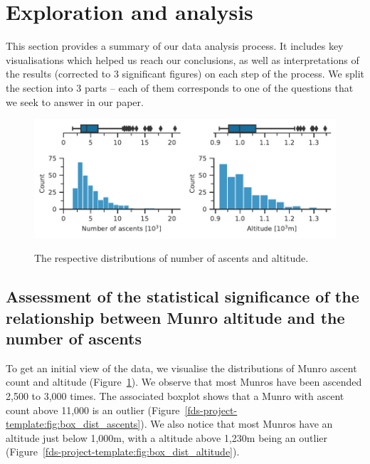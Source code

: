 \documentclass[11pt,a4paper]{article}
\begin{document}
\section{Exploration and  analysis}
This section provides a summary of our data analysis process. It includes key visualisations which helped us reach our conclusions, as well as interpretations of the results (corrected to 3 significant figures) on each step of the process. We split the section into 3 parts – each of them corresponds to one of the questions that we seek to answer in our paper.
\begin{figure} [h!]
    \centering
    \includegraphics{report/box_dist.pdf}
    \begin{minipage}[t]{.5\linewidth}
        \centering
        \label{fds-project-template:fig:box_dist_ascents}
    \end{minipage}%
    \begin{minipage}[t]{.5\linewidth}
        \centering
        \label{fds-project-template:fig:box_dist_altitude}
    \end{minipage}
    \caption{The respective distributions of number of ascents and altitude.}
      \label{fds-project-template:fig:box_dist}
\end{figure}
\subsection{Assessment of the statistical significance of the relationship between Munro altitude and the number of ascents}

To get an initial view of the data, we visualise the distributions of Munro ascent count and altitude (Figure~\ref{fds-project-template:fig:box_dist}). We observe that most Munros have been ascended 2,500 to 3,000 times. The associated boxplot shows that a Munro with ascent count above 11,000 is an outlier (Figure~\ref{fds-project-template:fig:box_dist_ascents}). We also notice that most Munros have an altitude just below 1,000m, with a altitude above 1,230m being an outlier (Figure~\ref{fds-project-template:fig:box_dist_altitude}).
\end{document}
